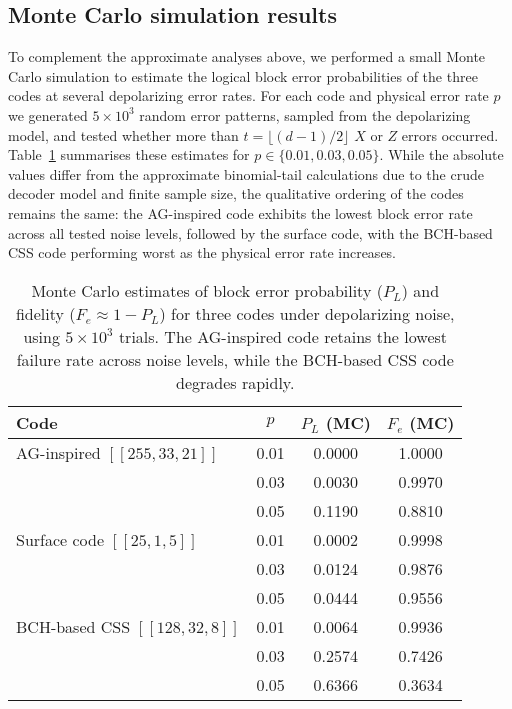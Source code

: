 \documentclass[conference]{IEEEtran}  %
\begin{document}
\subsection*{Monte Carlo simulation results}
To complement the approximate analyses above, we performed a small Monte Carlo simulation to estimate the logical block error probabilities of the three codes at several depolarizing error rates.  For each code and physical error rate $p$ we generated $5\times 10^3$ random error patterns, sampled from the depolarizing model, and tested whether more than $t=\lfloor(d-1)/2\rfloor$ $X$ or $Z$ errors occurred.  Table~\ref{tab:mc} summarises these estimates for $p\in\{0.01,0.03,0.05\}$.  While the absolute values differ from the approximate binomial-tail calculations due to the crude decoder model and finite sample size, the qualitative ordering of the codes remains the same: the AG-inspired code exhibits the lowest block error rate across all tested noise levels, followed by the surface code, with the BCH-based CSS code performing worst as the physical error rate increases.

\begin{table}[t]
\centering
\caption{Monte Carlo estimates of block error probability ($P_L$) and fidelity ($F_e \approx 1-P_L$) for three codes under depolarizing noise, using $5\times 10^3$ trials.  The AG-inspired code retains the lowest failure rate across noise levels, while the BCH-based CSS code degrades rapidly.}
\label{tab:mc}
\begin{tabular}{lccc}
\hline
\textbf{Code} & \textbf{$p$} & \textbf{$P_L$ (MC)} & \textbf{$F_e$ (MC)} \\
\hline
AG-inspired $[[255,33,21]]$ & 0.01 & 0.0000 & 1.0000 \\
 & 0.03 & 0.0030 & 0.9970 \\
 & 0.05 & 0.1190 & 0.8810 \\
Surface code $[[25,1,5]]$ & 0.01 & 0.0002 & 0.9998 \\
 & 0.03 & 0.0124 & 0.9876 \\
 & 0.05 & 0.0444 & 0.9556 \\
BCH-based CSS $[[128,32,8]]$ & 0.01 & 0.0064 & 0.9936 \\
 & 0.03 & 0.2574 & 0.7426 \\
 & 0.05 & 0.6366 & 0.3634 \\
\hline
\end{tabular}
\end{table}
\end{document}
